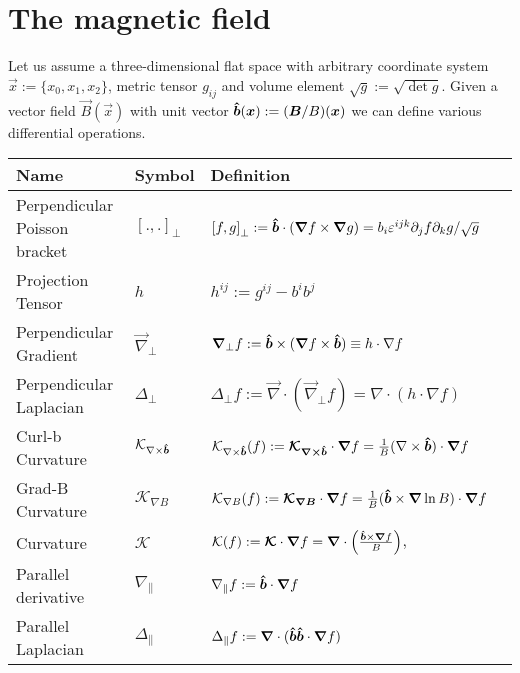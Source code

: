 \section{The magnetic field}\label{sec:magnetic}
Let us assume a three-dimensional flat space with arbitrary coordinate
system $\vec x :=\{x_0, x_1, x_2\}$, metric
tensor $g_{ij}$ and volume element $\sqrt{g} := \sqrt{\det g}$.
Given a vector field $\vec B(\vec x)$ with unit vector $\bm{\hat{b}}({\boldsymbol{x}}) := ({\boldsymbol{B}}/B)({{\boldsymbol{x}}})$
we can define various differential operations.
\begin{longtable}{lll>{\RaggedRight}p{7cm}}
\rowcolor{gray!50}\textbf{Name} &  \textbf{Symbol} & \textbf{Definition} \\
\midrule
    Perpendicular Poisson bracket&
    $\left[.,.\right]_\perp$ &
    $\left[f,g\right]_\perp := \bm{\hat{b}} \cdot \left({\boldsymbol{\nabla}} f \times {\boldsymbol{\nabla}} g\right) =
    b_i \varepsilon^{ijk}\partial_j f\partial_k g/\sqrt{g}$  \\
    Projection Tensor&
    $h $ & $h^{ij} := g^{ij} - b^ib^j $\\
    Perpendicular Gradient&
    $\vec \nabla_\perp $&
    $ {\boldsymbol{\nabla}}_\perp f := \bm{\hat{b}}\times({\boldsymbol{\nabla}} f\times \bm{\hat{b}} ) \equiv
    h \cdot \nabla f$ \\
    Perpendicular Laplacian&
    $\Delta_\perp $&
    $ \Delta_\perp f:= \vec \nabla\cdot (\vec \nabla_\perp f)
    = \nabla\cdot( h\cdot\nabla f)$  \\
    Curl-b Curvature &
    $\mathcal K_{\nabla\times\bm{\hat{b}}}$ &
    $\mathcal K_{\nabla\times\bm{\hat{b}}}(f) := {\boldsymbol{ \mathcal K_{\nabla\times\bm{\hat{b}}} }}\cdot {\boldsymbol{\nabla}} f = \frac{1}{B}(\nabla \times \bm{\hat{b}})\cdot {\boldsymbol{\nabla}} f$ \\[4pt]
    Grad-B Curvature &
    $\mathcal K_{\nabla B} $ &
    $\mathcal K_{\nabla B}(f) := {\boldsymbol{\mathcal K_{\nabla B}}} \cdot {\boldsymbol{\nabla}} f = \frac{1}{B}(\bm{\hat{b}} \times {\boldsymbol{\nabla}} \ln B)\cdot {\boldsymbol{\nabla}} f$ \\[4pt]
    Curvature &
    $\mathcal K$ &
    $\mathcal{K}(f):={\boldsymbol{\mathcal K}} \cdot {\boldsymbol{\nabla}} f =
     {\boldsymbol{\nabla}}\cdot\left(\frac{\bm{\hat{b}}\times{\boldsymbol{\nabla}} f}{B}\right)$,\\[4pt]
    Parallel derivative&
    $\nabla_\parallel $&
    $ \nabla_\parallel f := \bm{\hat{b}}\cdot{\boldsymbol{\nabla}} f$ \\
    Parallel Laplacian&
    $\Delta_\parallel $&
    $\Delta_\parallel f:= {\boldsymbol{\nabla}} \cdot ( \bm{\hat{b}}\bm{\hat{b}}\cdot{\boldsymbol{\nabla}} f )$\\
\bottomrule
\end{longtable}
